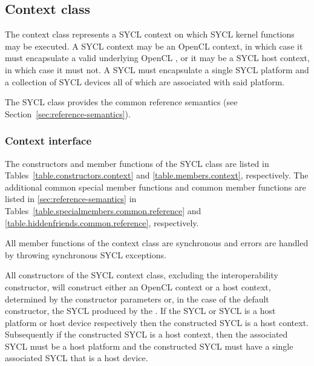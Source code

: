 \subsection{Context class}
\label{sec:interface.context.class}

The \gls{context} class represents a SYCL \gls{context} on which SYCL kernel functions may be executed. A SYCL \gls{context} may be an OpenCL context, in which case it must encapsulate a valid underlying OpenCL , or it may be a SYCL host context, in which case it must not. A SYCL  must encapsulate a single SYCL \gls{platform} and a collection of SYCL \gls{device}s all of which are associated with said \gls{platform}.

The SYCL  class provides the common reference semantics
(see Section~\ref{sec:reference-semantics}).


\subsubsection{Context interface}

The constructors and member functions of the SYCL  class are listed in Tables~\ref{table.constructors.context} and \ref{table.members.context}, respectively. The additional common special member functions and common member functions are listed in \ref{sec:reference-semantics} in Tables~\ref{table.specialmembers.common.reference} and \ref{table.hiddenfriends.common.reference}, respectively.

All member functions of the \gls{context} class are synchronous and errors are handled by throwing synchronous SYCL exceptions.

All constructors of the SYCL \gls{context} class, excluding the interoperability constructor, will construct either an OpenCL context or a host context, determined by the constructor parameters or, in the case of the default constructor, the SYCL  produced by the . If the SYCL  or SYCL  is a host platform or host device respectively then the constructed SYCL  is a host context. Subsequently if the constructed SYCL  is a host context, then the associated SYCL  must be a host platform and the constructed SYCL  must have a single associated SYCL  that is a host device.

